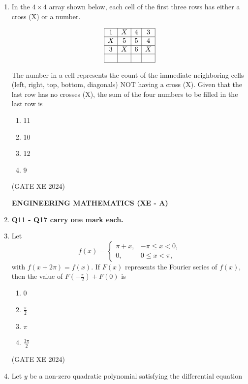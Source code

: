 \documentclass[12pt]{article}
\begin{document}
\begin{enumerate}
\item In the $4 \times 4$ array shown below, each cell of the first three rows has either a cross (X) or a number.  

$$
\begin{array}{|c|c|c|c|}
\hline
1 & X & 4 & 3 \\ \hline
X & 5 & 5 & 4 \\ \hline
3 & X & 6 & X \\ \hline
  &   &   &   \\ \hline
\end{array}
$$

The number in a cell represents the count of the immediate neighboring cells (left, right, top, bottom, diagonals) NOT having a cross (X). Given that the last row has no crosses (X), the sum of the four numbers to be filled in the last row is  

\begin{enumerate}
\item 11  
\item 10  
\item 12  
\item 9  
\end{enumerate}
(GATE XE 2024)



\newpage

\begin{center}
    {\Large \textbf{ENGINEERING MATHEMATICS (XE - A)}}
\end{center}

\item[] \textbf{Q11 - Q17 carry one mark each.}
\item Let 
$$
f(x) = 
\begin{cases} 
\pi + x, & -\pi \leq x < 0, \\ 
0, & 0 \leq x < \pi,
\end{cases}
$$
with $f(x+2\pi) = f(x)$. If $F(x)$ represents the Fourier series of $f(x)$, then the value of $F\!\left(-\tfrac{\pi}{2}\right) + F(0)$ is  

\begin{enumerate}
\item 0  
\item $\tfrac{\pi}{2}$  
\item $\pi$  
\item $\tfrac{3\pi}{2}$  
\end{enumerate}
(GATE XE 2024)

\item Let $y$ be a non-zero quadratic polynomial satisfying the differential equation  


\end{enumerate}
\end{document}
